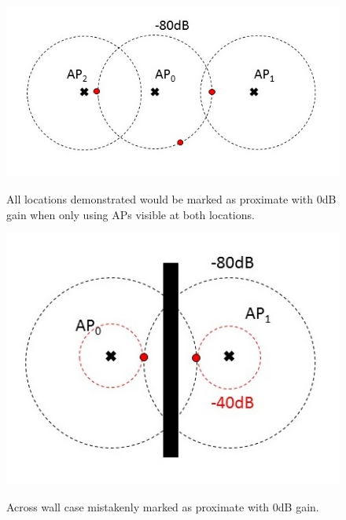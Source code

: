 \documentclass{UoYCSproject}
\begin{document}
            \begin{figure}[h]
            	\centering
            	\begin{minipage}{0.45\textwidth}
            		\centering
                    \label{fig:overlap}
            		\includegraphics[width=\textwidth]{single_overlap.jpg}
            		\caption{All locations demonstrated would be marked as proximate with $0$dB gain when only using APs visible at both locations.}
            	\end{minipage}\hfill
            	\begin{minipage}{0.45\textwidth}
            		\centering
                    \label{fig:wall}
            		\includegraphics[width=1\textwidth]{wall.jpg}
            		\caption{Across wall case mistakenly marked as proximate with $0$dB gain.}
            	\end{minipage}
            \end{figure}
            
\end{document}
